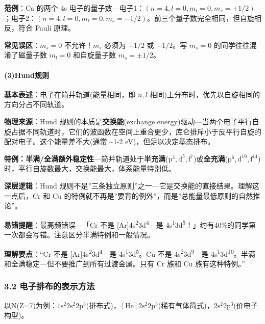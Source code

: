 \textbf{范例}：Ca 的两个 4s 电子的量子数---电子1：\((n=4,l=0,m_l=0,m_s=+1/2)\)；电子2：\((n=4,l=0,m_l=0,m_s=-1/2)\)。前三个量子数完全相同，但自旋相反，符合 Pauli 原理。

\textbf{常见误区}：\(m_s=0\) 不允许！\(m_s\) 必须为 \(+1/2\) 或 \(-1/2\)。写 \(m_s=0\) 的同学往往混淆了磁量子数 \(m_l=0\) 和自旋量子数 \(m_s=±1/2\)。

\paragraph{(3)Hund规则}\label{hundux89c4ux5219}

\textbf{基本表述}：电子在简并轨道(能量相同，即 \(n,l\) 相同)上分布时，优先以自旋相同的方向分占不同轨道。

\textbf{物理来源}：Hund 规则的本质是\textbf{交换能}(exchange energy)驱动---当两个电子平行自旋占据不同轨道时，它们的波函数在空间上重合更少，库仑排斥小于反平行自旋的配对电子。这个能量差不大(通常 \textasciitilde1-2 eV)，但足以决定基态排布。

\textbf{特例：半满/全满额外稳定性}---简并轨道处于\textbf{半充满}(\(\mathrm{p^3, d^5, f^7}\))或\textbf{全充满}(\(\mathrm{p^6, d^{10}, f^{14}}\))时，平行自旋数最大，交换能最大，体系能量特别低。

\textbf{深层逻辑}：Hund 规则不是''三条独立原则''之一---它是交换能的直接结果。理解这一点后，Cr 和 Cu 的特例就不再是''要背的例外''，而是''总能量最低原则的自然推论''。

\textbf{易错提醒}：最高频错误---「Cr 不是 {[}Ar{]}4s\textsuperscript{2}3d\textsuperscript{4}---是 4s\textsuperscript{1}3d\textsuperscript{5}！」约有40\%的同学第一次都会写错。注意区分半满特例和一般情况。

\textbf{理解要点}：``Cr 不是 {[}Ar{]}4s\textsuperscript{2}3d\textsuperscript{4}---是 4s\textsuperscript{1}3d\textsuperscript{5}。Cu 不是 4s\textsuperscript{2}3d\textsuperscript{9}---是 4s\textsuperscript{1}3d\textsuperscript{10}。半满和全满稳定---但不要推广到所有过渡金属。只有 Cr 族和 Cu 族有这种特例。''

\subsubsection{3.2 电子排布的表示方法}\label{ux7535ux5b50ux6392ux5e03ux7684ux8868ux793aux65b9ux6cd5}

以N(Z=7)为例：\(1\mathrm{s}^2 2\mathrm{s}^2 2\mathrm{p}^3\)(排布式)，\([\mathrm{He}] 2\mathrm{s}^2 2\mathrm{p}^3\)(稀有气体简式)，\(2\mathrm{s}^2 2\mathrm{p}^3\)(价电子构型)。

